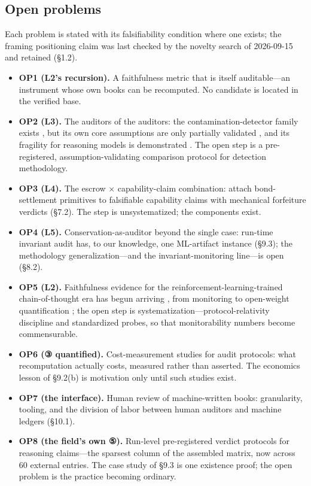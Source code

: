 \documentclass[11pt,a4paper]{article}
\begin{document}
\subsection{Open problems}

Each problem is stated with its falsifiability condition where one exists; the framing positioning claim was last checked by the novelty search of 2026-09-15 and retained (§1.2).

\begin{itemize}[leftmargin=1.6em]
\item \textbf{OP1 (L2's recursion).} A faithfulness metric that is itself auditable—an instrument whose own books can be recomputed. No candidate is located in the verified base.
\item \textbf{OP2 (L3).} The auditors of the auditors: the contamination-detector family exists \cite{key36,key37,key38,key39,key40,key41}, but its own core assumptions are only partially validated \cite{key39}, and its fragility for reasoning models is demonstrated \cite{key42}. The open step is a pre-registered, assumption-validating comparison protocol for detection methodology.
\item \textbf{OP3 (L4).} The escrow × capability-claim combination: attach bond-settlement primitives \cite{key48,key49,key50,key51} to falsifiable capability claims with mechanical forfeiture verdicts (§7.2). The step is unsystematized; the components exist.
\item \textbf{OP4 (L5).} Conservation-as-auditor beyond the single case: run-time invariant audit has, to our knowledge, one ML-artifact instance (§9.3); the methodology generalization—and the invariant-monitoring line—is open (§8.2).
\item \textbf{OP5 (L2).} Faithfulness evidence for the reinforcement-learning-trained chain-of-thought era has begun arriving \cite{key29,key30,key31,key32,key34}, from monitoring \cite{key30} to open-weight quantification \cite{key32}; the open step is systematization—protocol-relativity discipline and standardized probes, so that monitorability numbers become commensurable.
\item \textbf{OP6 (③ quantified).} Cost-measurement studies for audit protocols: what recomputation actually costs, measured rather than asserted. The economics lesson of §9.2(b) is motivation only until such studies exist.
\item \textbf{OP7 (the interface).} Human review of machine-written books: granularity, tooling, and the division of labor between human auditors and machine ledgers (§10.1).
\item \textbf{OP8 (the field's own ⑤).} Run-level pre-registered verdict protocols for reasoning claims—the sparsest column of the assembled matrix, now across 60 external entries. The case study of §9.3 is one existence proof; the open problem is the practice becoming ordinary.
\end{itemize}
\end{document}
